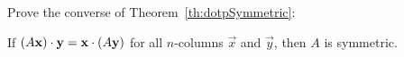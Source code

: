 \documentclass{ximera}
\begin{document}
\begin{problem}

\end{problem}


\begin{problem}\label{ex:8_2_15}
Prove the converse of Theorem~\ref{th:dotpSymmetric}:

If $(A\mathbf{x}) \cdot \mathbf{y} = \mathbf{x} \cdot (A\mathbf{y})$ for all $n$-columns $\vec{x}$ and $\vec{y}$, then $A$ is symmetric.

\end{problem}
\end{document}
